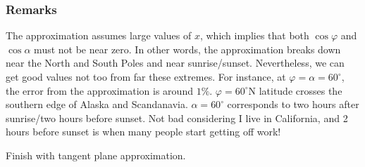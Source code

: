 \documentclass[10pt]{article}
\begin{document}
\subsubsection{Remarks}
The approximation assumes large values of $x$, which implies that both $\cos\varphi$ and  $\cos\alpha$ must not be near zero. In other words, the approximation breaks down near the North and South Poles and near sunrise/sunset. Nevertheless, we can get good values not too from far these extremes. For instance, at $\varphi = \alpha = 60^{\circ}$, the error from the approximation is around $1\%$. $\varphi = 60^{\circ}$N latitude crosses the southern edge of Alaska and Scandanavia. $\alpha = 60^{\circ}$ corresponds to two hours after sunrise/two hours before sunset. Not bad considering I live in California, and 2 hours before sunset is when many people start getting off work!

\vspace{10pt} Finish with tangent plane approximation.

%

\end{document}
